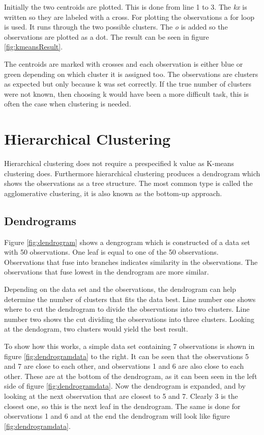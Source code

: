 Initially the two centroids are plotted. This is done from line 1 to 3. The \emph{kx} is written so they are labeled with a cross. For plotting the observations a for loop is used. It runs through the two possible clusters. The \emph{o} is added so the observations are plotted as a dot. 
The result can be seen in figure \ref{fig:kmeansResult}.


The centroids are marked with crosses and each observation is either blue or green depending on which cluster it is assigned too. The observations are clusters as expected but only because k was set correctly. If the true number of clusters were not known, then choosing k would have been a more difficult task, this is often the case when clustering is needed.


\section{Hierarchical Clustering}
Hierarchical clustering does not require a prespecified k value as K-means clustering does.
Furthermore hierarchical clustering produces a dendrogram which shows the observations as a tree structure.
The most common type is called the agglomerative clustering, it is also known as the bottom-up approach.

\subsection{Dendrograms}
Figure \ref{fig:dendrogram} shows a dengrogram which is constructed of a data set with 50 observations.
One leaf is equal to one of the 50 observations. Observations that fuse into branches indicates similarity in the observations. The observations that fuse lowest in the dendrogram are more similar.

Depending on the data set and the observations, the dendrogram can help determine the number of clusters that fits the data best. Line number one shows where to cut the dendrogram to divide the observations into two clusters. Line number two shows the cut dividing the observations into three clusters. Looking at the dendogram, two clusters would yield the best result.



\FloatBarrier
To show how this works, a simple data set containing 7 observations is shown in figure \ref{fig:dendrogramdata} to the right.
It can be seen that the observations 5 and 7 are close to each other, and observations 1 and 6 are also close to each other. These are at the bottom of the dendrogram, as it can been seen in the left side of figure \ref{fig:dendrogramdata}. Now the dendrogram is expanded, and by looking at the next observation that are closest to 5 and 7. Clearly 3 is the closest one, so this is the next leaf in the dendrogram. The same is done for observations 1 and 6 and at the end the dendrogram will look like figure \ref{fig:dendrogramdata}.

